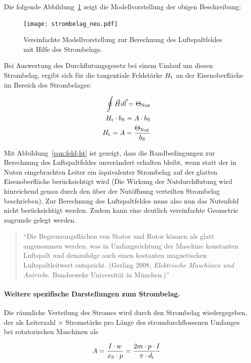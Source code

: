 Die folgende Abbildung~\ref{fig:strombelag-neu} zeigt die Modellvorstellung der obigen Beschreibung:
\newpage

\begin{figure}[!h]
\centering
\texttt{[image: strombelag\_neu.pdf]}
\label{fig:strombelag-neu}
\caption{Vereinfachte Modellvorstellung zur Berechnung des Luftspaltfeldes mit Hilfe des Strombelags.}
\end{figure}

Bei Auswertung des Durchflutungsgesetz bei einem Umlauf um diesen Strombelag, ergibt sich für die tangentiale Feldstärke $H_{\mathrm{t}}$ an der Eisenoberfläche im Bereich des Strombelages:

\begin{align}
\oint \vec{H}d\vec{l} = \Theta_{\mathrm{Nut}} \\
H_{\mathrm{t}}\cdot b_{\mathrm{S}} = A\cdot b_{\mathrm{S}} \\
H_{\mathrm{t}} = A = \frac{\Theta_{\mathrm{Nut}}}{b_{\mathrm{S}}} \label{eqn:feld-ht}
\end{align}

Mit Abbildung~\ref{eqn:feld-ht} ist gezeigt, dass die Randbedingungen zur Berechnung des Luftspaltfeldes unverändert erhalten bleibt, wenn statt der in Nuten eingebrachten Leiter ein äquivalenter Strombelag auf der glatten Eisenoberfläche berücksichtigt wird (Die Wirkung der Nutdurchflutung wird hinreichend genau durch den über der Nutöffnung verteilten Strombelag beschrieben).
Zur Berechnung des Luftspaltfeldes muss also nun das Nutenfeld nicht berücksichtigt werden.
Zudem kann eine deutlich vereinfachte Geometrie zugrunde gelegt werden.

\begin{quote}
\enquote{Die Begrenzungsflächen von Stator und Rotor können als glatt angenommen werden, was in Umfangsrichtung der Maschine konstanten Luftspalt und demzufolge auch einen kostanten magnetischen Luftspaltleitwert entspricht. (Gerling 2008, \emph{Elektrische Maschinen und Antriebe}. Bundeswehr Universität in München.)}
\end{quote}

\paragraph{Weitere spezifische Darstellungen zum Strombelag.}
Die räumliche Verteilung des Stromes wird durch den Strombelag wiedergegeben, der als Leiterzahl $\times$ Stromstärke pro Länge des stromdurchflossenen Umfanges bei rotatorischen Maschinen als 

\begin{align}
A = \frac{I \cdot w}{x_{\mathrm{S}}\cdot p} = \frac{2m \cdot p\cdot I}{\pi \cdot d_{\mathrm{i}}} \label{eqn:strombelag2}
\end{align}

